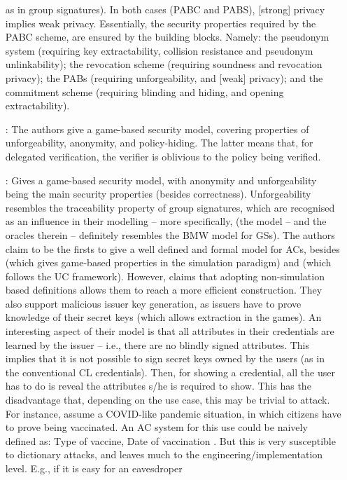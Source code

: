 \begin{enumerate}
  as in group signatures). In both cases (PABC and PABS), [strong] privacy
  implies weak privacy.
  Essentially, the security properties required by the PABC scheme, are
  ensured by the building blocks. Namely: the pseudonym system (requiring
  key extractability, collision resistance and pseudonym unlinkability); the
  revocation scheme (requiring soundness and revocation privacy); the
  PABs (requiring unforgeability, and [weak] privacy); and the commitment
  scheme (requiring blinding and hiding, and opening extractability).
\item[\cite{dmm+18}:] The authors give a game-based security model, covering
  properties of unforgeability, anonymity, and policy-hiding. The latter
  means that, for delegated verification, the verifier is oblivious to the
  policy being verified.
\item[\cite{fhs19}:] Gives a game-based security model, with anonymity and
  unforgeability being the main security properties (besides correctness).
  Unforgeability resembles the traceability property of group signatures,
  which are recognised as an influence in their modelling -- more specifically,
  \cite{bmw03} (the model -- and the oracles therein -- definitely resembles
  the BMW model for GSs). The authors claim to be the firsts to give a well defined and
  formal model for ACs, besides \cite{ckl+15} (which gives game-based properties
  in the simulation paradigm) and \cite{cdhk15} (which follows the UC framework).
  However, \cite{fhs19} claims that adopting non-simulation based definitions
  allows them to reach a more efficient construction. They also support malicious
  issuer key generation, as issuers have to prove knowledge of their secret keys
  (which allows extraction in the games).
  An interesting aspect of their model is that all attributes in their
  credentials are learned by the issuer -- i.e., there are no blindly signed
  attributes. This implies that it is not possible to sign secret keys owned
  by the users (as in the conventional CL credentials). Then, for showing a
  credential, all the user has to do is reveal the attributes s/he is required
  to show. This has the disadvantage that, depending on the use case, this may
  be trivial to attack. For instance, assume a COVID-like pandemic situation,
  in which citizens have to prove being vaccinated. An AC system for this use
  could be naively defined as: { Type of vaccine, Date of vaccination }. But
  this is very susceptible to dictionary attacks, and leaves much to the
  engineering/implementation level. E.g., if it is easy for an eavesdroper

\end{enumerate}
